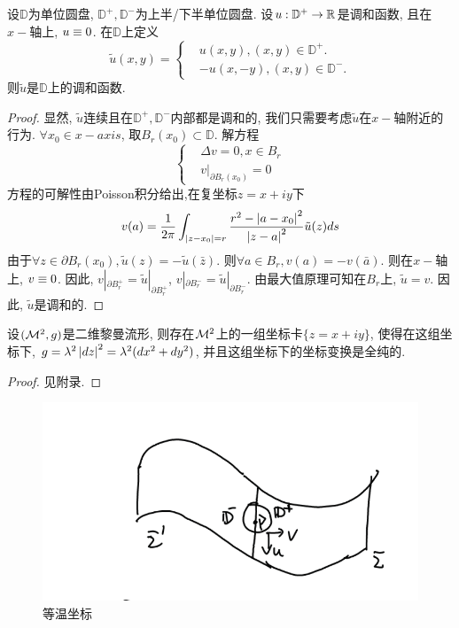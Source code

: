 \begin{lemma}
    设$\mathbb{D}$为单位圆盘, $\mathbb{D}^+,\mathbb{D}^-$为上半/下半单位圆盘. 设$u: \mathbb{D}^+ \to \mathbb{R}$是调和函数, 且在$x-$轴上, $u\equiv 0$. 在$\mathbb{D}$上定义
    \begin{equation}
        \tilde{u}(x,y)= \left\{
            \begin{aligned}
                &u(x,y), (x,y) \in \mathbb{D}^+.\\
                &-u(x,-y), (x,y) \in \mathbb{D}^-.
            \end{aligned}
        \right.
    \end{equation}
    则$\tilde{u}$是$\mathbb{D}$上的调和函数.
\end{lemma}
\begin{proof}
    显然, $\tilde{u}$连续且在$\mathbb{D}^+,\mathbb{D}^-$内部都是调和的, 我们只需要考虑$\tilde{u}$在$x-$轴附近的行为. $\forall x_0 \in x-axis$, 取$B_r(x_0) \subset \mathbb{D}$. 解方程
    \begin{equation}
        \left\{
            \begin{aligned}
                &\Delta v=0, x \in B_r\\
                & v|_{\partial B_r(x_0)}=0
            \end{aligned}
        \right.
    \end{equation}
    方程的可解性由Poisson积分给出,在复坐标$z=x+iy$下
    \begin{equation}
        v(a)=\frac{1}{2\pi} \int_{\left | z-x_0 \right |=r} \frac{r^2-\left | a-x_0 \right |^2}{\left | z-a \right |^2}\tilde{u}(z)ds
    \end{equation}
    由于$\forall z \in \partial B_r(x_0), \tilde{u}(z)=-\tilde{u}(\bar{z})$. 则$\forall a\in B_r, v(a)=-v(\bar{a})$. 则在$x-$轴上, $v\equiv 0$. 因此, $v|_{\partial{B_r^+}}=\tilde{u}|_{\partial{B_r^+}}$, $v|_{\partial{B_r^-}}=\tilde{u}|_{\partial{B_r^-}}$. 由最大值原理可知在$B_r$上, $\tilde{u}=v$. 因此, $\tilde{u}$是调和的.
\end{proof}
\begin{lemma}[等温坐标的存在性]
    设$({\mathcal{M}}^2, g)$是二维黎曼流形, 则存在${\mathcal{M}}^2$上的一组坐标卡$\{z=x+iy\}$, 使得在这组坐标下, $g=\lambda^2\left | dz \right |^2=\lambda^2(dx^2+dy^2)$, 并且这组坐标下的坐标变换是全纯的.
\end{lemma}
\begin{proof}
    见附录.
\end{proof}
\begin{figure}[ht]
	\centering
	\includegraphics[scale=0.8]{images/reflection2.png}
	\caption{等温坐标}
	\label{reflection2}
\end{figure}
